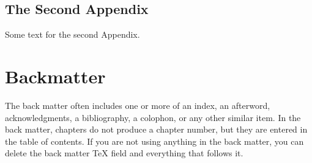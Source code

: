 \documentclass{book}%
\begin{document}
\chapter{The Second Appendix}

Some text for the second Appendix.

\backmatter

\part{Backmatter}

The back matter often includes one or more of an index, an afterword,
acknowledgments, a bibliography, a colophon, or any other similar item. In
the back matter, chapters do not produce a chapter number, but they are
entered in the table of contents. If you are not using anything in the back
matter, you can delete the back matter TeX field and everything that follows it.

\renewcommand\bibname{References}
\setlength{\bibsep}{2\baselineskip}
\setlength\bibindent{.5in}


\printglossary
\end{document}
